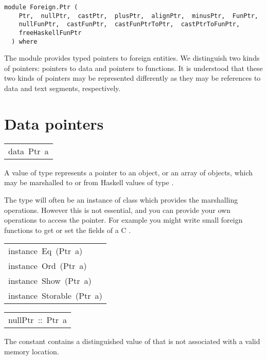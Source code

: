 \label{module:Foreign.Ptr}
\haddockbeginheader
{\haddockverb\begin{verbatim}
module Foreign.Ptr (
    Ptr,  nullPtr,  castPtr,  plusPtr,  alignPtr,  minusPtr,  FunPtr, 
    nullFunPtr,  castFunPtr,  castFunPtrToPtr,  castPtrToFunPtr, 
    freeHaskellFunPtr
  ) where\end{verbatim}}
\haddockendheader

The module  provides typed pointers to foreign
 entities.  We distinguish two kinds of pointers: pointers to data
 and pointers to functions.  It is understood that these two kinds
 of pointers may be represented differently as they may be
 references to data and text segments, respectively.
\par

\section{Data pointers
}
\begin{haddockdesc}
\item[\begin{tabular}{@{}l}
data\ Ptr\ a
\end{tabular}]\haddockbegindoc
A value of type  represents a pointer to an object, or an
 array of objects, which may be marshalled to or from Haskell values
 of type .
\par
The type  will often be an instance of class
  which provides the marshalling operations.
 However this is not essential, and you can provide your own operations
 to access the pointer.  For example you might write small foreign
 functions to get or set the fields of a C .
\par

\end{haddockdesc}
\begin{haddockdesc}
\item[\begin{tabular}{@{}l}
instance\ Eq\ (Ptr\ a)\\instance\ Ord\ (Ptr\ a)\\instance\ Show\ (Ptr\ a)\\instance\ Storable\ (Ptr\ a)
\end{tabular}]
\end{haddockdesc}
\begin{haddockdesc}
\item[\begin{tabular}{@{}l}
nullPtr\ ::\ Ptr\ a
\end{tabular}]\haddockbegindoc
The constant  contains a distinguished value of 
 that is not associated with a valid memory location.
\par

\end{haddockdesc}
